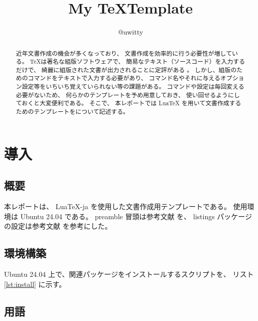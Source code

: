 \documentclass[a4paper]{ltjsarticle}
\title{My \TeX Template}
\author{@uwitty}
\begin{document}
\maketitle
\thispagestyle{empty}
\newpage


\begin{abstract}
近年文書作成の機会が多くなっており、
文書作成を効率的に行う必要性が増している。
\TeX は著名な組版ソフトウェアで、
簡易なテキスト（ソースコード）を入力するだけで、
綺麗に組版された文書が出力されることに定評がある \cite{bib:bibun9}。
しかし、組版のためのコマンドをテキストで入力する必要があり、
コマンド名やそれに与えるオプション設定等をいちいち覚えていられない等の課題がある。
コマンドや設定は毎回変える必要がないため、
何らかのテンプレートを予め用意しておき、
使い回せるようにしておくと大変便利である。
そこで、 
本レポートでは Lua\TeX \cite{bib:luatexjasite} を用いて文書作成するためのテンプレートをについて記述する。
\end{abstract}
\newpage

\tableofcontents

\newpage
{}

\section{導入}

\subsection{概要}

本レポートは、
Lua\TeX-ja \cite{bib:luatexjasite} を使用した文書作成用テンプレートである。
使用環境は Ubuntu 24.04 である。
preamble 冒頭は参考文献 \cite{bib:luatexpreamble} を、
listings パッケージの設定は参考文献 \cite{bib:lstsettings} を参考にした。

\subsection{環境構築}

Ubuntu 24.04 上で、関連パッケージをインストールするスクリプトを、
リスト \ref{lst:install} に示す。



\subsection{用語}
\end{document}
